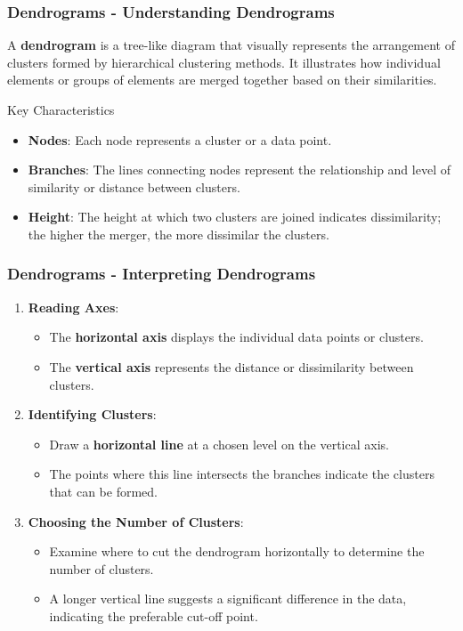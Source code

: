 \documentclass[aspectratio=169]{beamer}
\begin{document}
\begin{frame}[fragile]
    \frametitle{Dendrograms - Understanding Dendrograms}
    A \textbf{dendrogram} is a tree-like diagram that visually represents the arrangement of clusters formed by hierarchical clustering methods. It illustrates how individual elements or groups of elements are merged together based on their similarities.
    
    \begin{block}{Key Characteristics}
        \begin{itemize}
            \item \textbf{Nodes}: Each node represents a cluster or a data point.
            \item \textbf{Branches}: The lines connecting nodes represent the relationship and level of similarity or distance between clusters.
            \item \textbf{Height}: The height at which two clusters are joined indicates dissimilarity; the higher the merger, the more dissimilar the clusters.
        \end{itemize}
    \end{block}
\end{frame}

\begin{frame}[fragile]
    \frametitle{Dendrograms - Interpreting Dendrograms}
    \begin{enumerate}
        \item \textbf{Reading Axes}:
            \begin{itemize}
                \item The \textbf{horizontal axis} displays the individual data points or clusters.
                \item The \textbf{vertical axis} represents the distance or dissimilarity between clusters.
            \end{itemize}
        
        \item \textbf{Identifying Clusters}:
            \begin{itemize}
                \item Draw a \textbf{horizontal line} at a chosen level on the vertical axis.
                \item The points where this line intersects the branches indicate the clusters that can be formed.
            \end{itemize}
        
        \item \textbf{Choosing the Number of Clusters}:
            \begin{itemize}
                \item Examine where to cut the dendrogram horizontally to determine the number of clusters.
                \item A longer vertical line suggests a significant difference in the data, indicating the preferable cut-off point.
            \end{itemize}
    \end{enumerate}
\end{frame}
\end{document}
